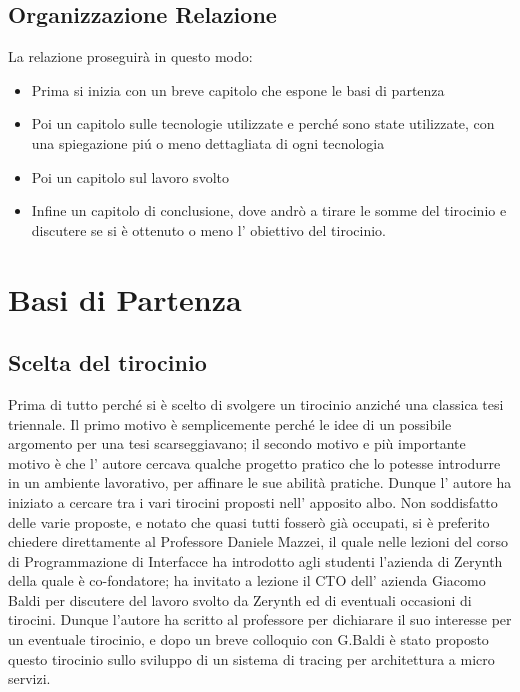 \documentclass[a4paper,12pt,titlepage,italian,openany]{report}
\begin{document}
\section{Organizzazione Relazione}
La relazione proseguirà in questo modo:
\begin{itemize}
    \item Prima si inizia con un breve capitolo che espone le basi di partenza
    \item Poi un capitolo sulle tecnologie utilizzate e perché sono state utilizzate, con una spiegazione piú o meno dettagliata di ogni tecnologia
    \item Poi un capitolo sul lavoro svolto 
    \item Infine un capitolo di conclusione, dove andrò a tirare le somme del tirocinio e discutere se si è ottenuto o meno l' obiettivo del tirocinio.
\end{itemize}



\chapter{Basi di Partenza}
\section{Scelta del tirocinio}
Prima di tutto perché si è scelto di svolgere un tirocinio anziché una classica tesi triennale. Il primo motivo è semplicemente perché le idee di un possibile argomento
per una tesi scarseggiavano; il secondo motivo e più importante motivo è che l' autore cercava qualche progetto pratico che lo potesse introdurre in un ambiente lavorativo, per affinare le sue abilità pratiche. Dunque l' autore ha iniziato a cercare tra i vari tirocini proposti nell' apposito albo. Non soddisfatto delle varie proposte, e notato che quasi tutti fosserò già occupati, si è preferito chiedere direttamente al Professore Daniele Mazzei, il quale nelle lezioni del corso di Programmazione di Interfacce ha introdotto agli studenti l'azienda di Zerynth della quale è co-fondatore; ha invitato a lezione 
il CTO dell' azienda Giacomo Baldi per discutere del lavoro svolto da Zerynth ed di eventuali occasioni di tirocini. Dunque l'autore ha scritto al professore per dichiarare il suo interesse per un eventuale tirocinio, e dopo un breve colloquio con G.Baldi è stato proposto questo tirocinio sullo sviluppo di un sistema di tracing per architettura a micro servizi.
\end{document}
